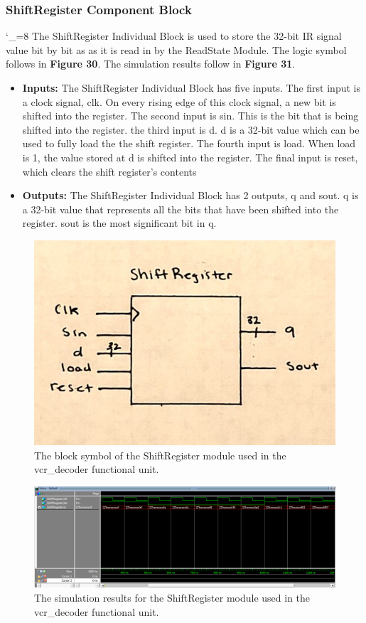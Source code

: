 \documentclass[a4paper]{article}
\begin{document}
\subsubsection{ShiftRegister Component Block}
\catcode`_=8
The ShiftRegister Individual Block is used to store the 32-bit IR signal value bit by bit as as it is read in by the ReadState Module. The logic symbol follows in \textbf{Figure 30}.  The simulation results follow in \textbf{Figure 31}.
\begin{itemize}
\item \textbf{Inputs:  } The ShiftRegister Individual Block has five inputs. The first input is a clock signal, clk. On every rising edge of this clock signal, a new bit is shifted into the register. The second input is sin. This is the bit that is being shifted into the register. the third input is d. d is a 32-bit value which can be used to fully load the the shift register. The fourth input is load. When load is 1, the value stored at d is shifted into the register. The final input is reset, which clears the shift register's contents
\item \textbf{Outputs: } The ShiftRegister Individual Block has 2 outputs, q and sout. q is a 32-bit value that represents all the bits that have been shifted into the register. sout is the most significant bit in q.
\end{itemize}
\begin{figure}[h]
\centering
\includegraphics[width=.48\textwidth]{functional_units/vcr_decoder/individual_blocks/ShiftRegister_symbol.png}
\caption{The block symbol of the ShiftRegister module used in the vcr\_decoder functional unit.}
\end{figure}
\begin{figure}[h]
\centering
\includegraphics[width=.98\textwidth]{functional_units/vcr_decoder/individual_blocks/ShiftRegister_sim.png}
\caption{The simulation results for the ShiftRegister module used in the vcr\_decoder functional unit.}
\end{figure}
\clearpage
\end{document}

